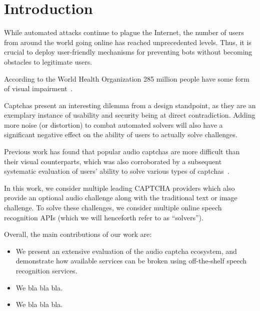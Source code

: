 \section{Introduction}
\label{sec:intro}

While automated attacks continue to plague the Internet, the number
of users from around the world going online has reached unprecedented levels.
Thus, it is crucial to deploy user-friendly mechanisms for preventing bots without
becoming obstacles to legitimate users.


According to the World Health Organization 285 million people have some form of visual impairment~\cite{impaired}.

Captchas present an interesting dilemma from a design standpoint, as they are an exemplary instance 
of usability and security being at direct contradiction. Adding more noise (or distortion) to combat 
automated solvers will also have a significant negative effect on the ability of users to actually
solve challenges.

Previous work has found that popular audio captchas are more difficult than their visual counterparts,
which was also corroborated by a subsequent systematic evaluation of users' ability to solve various types of
captchas~\cite{captchas-are-hard}.




In this work, we consider multiple leading CAPTCHA providers which also provide an optional audio 
challenge along with the traditional text or image challenge. To solve these challenges, we consider 
multiple online speech recognition APIs (which we will henceforth refer to as ``solvers'').


Overall, the main contributions of our work are:

\begin{itemize}

\item We present an extensive evaluation of the audio captcha ecosystem, and demonstrate how available services 
can be broken using off-the-shelf speech recognition services.

\item We bla bla bla.

\item We bla bla bla.

\end{itemize}

